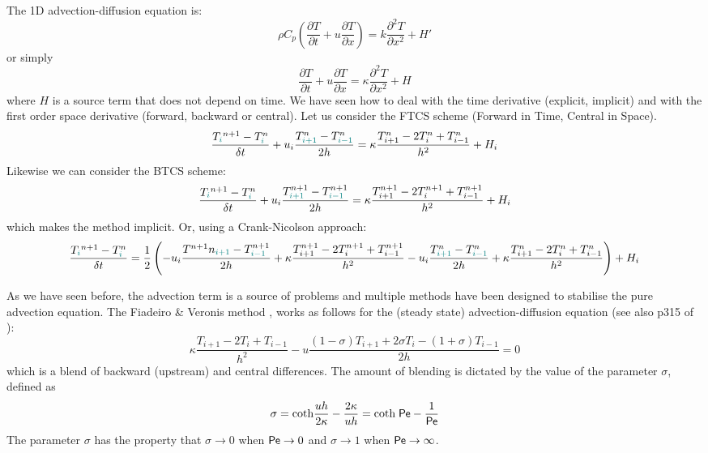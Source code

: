 The 1D advection-diffusion equation is:
\begin{equation}
\rho C_p \left( \frac{\partial T}{\partial t}  
+ u \frac{\partial T}{\partial x} \right)= k \frac{\partial^2 T}{\partial x^2} + H'
\end{equation}
or simply
\begin{equation}
\frac{\partial T}{\partial t} + u \frac{\partial T}{\partial x}= \kappa \frac{\partial^2 T}{\partial x^2} + H
\end{equation}
where $H$ is a source term that does not depend on time.
We have seen how to deal with the time derivative (explicit, implicit) 
and with the first order space derivative (forward, backward or central).
Let us consider the FTCS scheme (Forward in Time, Central in Space).
\[
\frac{T_{\color{teal}i}^{n+1}-T^n_{\color{teal}i}}{\delta t} 
+ u_i \frac{T^n_{\color{teal}i+1} - T^n_{{\color{teal}i-1}}}{2h} = \kappa \frac{T_{i+1}^n-2T_i^n+T_{i-1}^n}{h^2} + H_i
\]
Likewise we can consider the BTCS scheme:
\[
\frac{T_{\color{teal}i}^{n+1}-T^n_{\color{teal}i}}{\delta t} 
+ u_i \frac{T^{n+1}_{\color{teal}i+1} - T^{n+1}_{{\color{teal}i-1}}}{2h} 
= \kappa \frac{T_{i+1}^{n+1}-2T_i^{n+1}+T_{i-1}^{n+1}}{h^2} + H_i
\]
which makes the method implicit. 
Or, using a Crank-Nicolson approach:
\[
\frac{T_{\color{teal}i}^{n+1}-T^n_{\color{teal}i}}{\delta t} 
=
\frac12
\left(
- u_i \frac{T^{n+1}n_{\color{teal}i+1} - T^{n+1}_{{\color{teal}i-1}}}{2h} 
+ \kappa \frac{T_{i+1}^{n+1}-2T_i^{n+1}+T_{i-1}^{n+1}}{h^2} 
- u_i \frac{T^n_{\color{teal}i+1} - T^n_{{\color{teal}i-1}}}{2h} + \kappa \frac{T_{i+1}^n-2T_i^n+T_{i-1}^n}{h^2} 
\right)
+ H_i
\]




As we have seen before, the advection term is a source of problems and multiple 
methods have been designed to stabilise the pure advection equation. 
The {\color{olive}Fiadeiro \& Veronis method} \cite{five77}, works as follows for the (steady state)
advection-diffusion equation (see also p315 of \textcite{boudreau}):
\[
\kappa \frac{T_{i+1}-2T_i + T_{i-1}}{h^2}
- u \frac{(1-\sigma) T_{i+1}+2\sigma T_i -(1+\sigma)T_{i-1}}{2 h} = 0
\]
which is a blend of backward (upstream) and central differences. The amount of
blending is dictated by the value of the parameter $\sigma$, defined as
\[
\sigma 
= \text{coth} \frac{u h}{2 \kappa} - \frac{2 \kappa}{u h}
= \text{coth} \; {\mathsf{Pe}}  - \frac{1}{{\mathsf{Pe}}}
\]
The parameter $\sigma$ has the property that
$\sigma \rightarrow 0$ when ${\mathsf{Pe}} \rightarrow 0$ and 
$\sigma \rightarrow 1$ when ${\mathsf{Pe}} \rightarrow \infty$.

